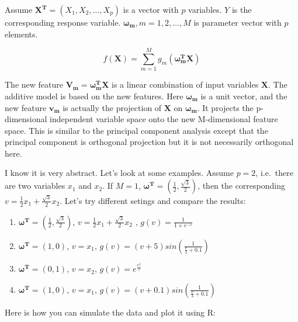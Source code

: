 \documentclass[
  12pt,
]{krantz}
\begin{document}
Assume \(\mathbf{X^{T}}=(X_1,X_2,\dots,X_p)\) is a vector with \(p\) variables. \(Y\) is the corresponding response variable. \(\mathbf{\omega_{m}},m=1,2,\dots,M\) is parameter vector with \(p\) elements.

\[f(\mathbf{X})=\sum_{m=1}^{M}g_{m}(\mathbf{\omega_{m}^{T}X})\]

The new feature \(\mathbf{V_{m}}=\mathbf{\omega_{m}^{T}X}\) is a linear combination of input variables \(\mathbf{X}\). The additive model is based on the new features. Here \(\mathbf{\omega_{m}}\) is a unit vector, and the new feature \(\mathbf{v_m}\) is actually the projection of \(\mathbf{X}\) on \(\mathbf{\omega_{m}}\). It projects the p-dimensional independent variable space onto the new M-dimensional feature space. This is similar to the principal component analysis except that the principal component is orthogonal projection but it is not necessarily orthogonal here.

I know it is very abstract. Let's look at some examples. Assume \(p=2\), i.e.~there are two variables \(x_1\) and \(x_2\). If \(M=1\), \(\mathbf{\omega^{T}}=(\frac{1}{2},\frac{\sqrt{3}}{2})\), then the corresponding \(v=\frac{1}{2}x_{1}+\frac{\sqrt{3}}{2}x_{2}\). Let's try different setings and compare the results:

\begin{enumerate}
\def\labelenumi{\arabic{enumi}.}
\item
  \(\mathbf{\omega^{T}}=(\frac{1}{2},\frac{\sqrt{3}}{2})\), \(v=\frac{1}{2}x_{1}+\frac{\sqrt{3}}{2}x_{2}\) , \(g(v)=\frac{1}{1+e^{-v}}\)
\item
  \(\mathbf{\omega^{T}}=(1,0)\), \(v = x_1\), \(g(v)=(v+5)sin(\frac{1}{\frac{v}{3}+0.1})\)
\item
  \(\mathbf{\omega^{T}}=(0,1)\), \(v = x_2\), \(g(v)=e^{\frac{v^2}{5}}\)
\item
  \(\mathbf{\omega^{T}}=(1,0)\), \(v = x_1\), \(g(v)=(v+0.1)sin(\frac{1}{\frac{v}{3}+0.1})\)
\end{enumerate}

Here is how you can simulate the data and plot it using R:
\end{document}
